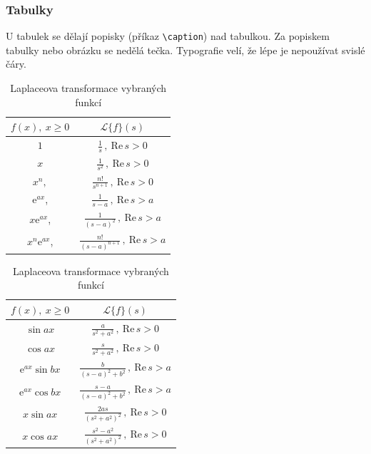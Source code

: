 \documentclass[a4paper,12pt,twoside]{article}
\theoremstyle{definition}
\theoremstyle{remark}
\numberwithin{equation}{section}
\numberwithin{table}{section}
\numberwithin{figure}{section}
\newcommand{\e}{\mathrm{e}}
\newcommand{\lapl}[1]{\mathcal{L}\{#1\}(s)}
\begin{document}
\subsubsection*{Tabulky}
U tabulek se dělají popisky (příkaz \verb!\caption!) nad tabulkou. Za popiskem tabulky nebo obrázku se nedělá tečka. Typografie velí, že lépe je nepoužívat svislé čáry.
\begin{table}[h!]
	\centering
	\caption{Laplaceova transformace vybraných funkcí}\label{tab1}
	\begin{tabular}{cc}
		\toprule
		$f(x),\ x\geq 0$ & $\lapl{f}$\\\midrule
		$1$ & $\displaystyle\frac{1}{s}\,,\ \mathrm{Re}\, s>0$ \\[3mm]
		$x$ & $\displaystyle\frac{1}{s^2}\,,\ \mathrm{Re}\, s>0$ \\[3mm]
		$x^n,$ & $\displaystyle\frac{n!}{s^{n+1}}\,,\ \mathrm{Re}\, s>0$\\[3mm]
		$\e^{ax}$, & $\displaystyle\frac{1}{s-a}\,,\ \mathrm{Re}\,s>a$ \\[3mm]
		$x\e^{ax}$, & $\displaystyle\frac{1}{(s-a)^2}\,,\ \mathrm{Re}\, s>a$ \\[3mm]
		$x^n\e^{ax}$, & $\displaystyle\frac{n!}{(s-a)^{n+1}}\,,\ \mathrm{Re}\, s>a$\\[2mm]
		\bottomrule
	\end{tabular}
	\hspace{1cm}
	\begin{tabular}{cc}
		\toprule
		$f(x),\ x\geq 0$ & $\lapl{f}$\\\midrule
		$\sin ax$ & $\displaystyle\frac{a}{s^2+a^2}\,,\ \mathrm{Re}\, s>0$\\[3mm]
		$\cos ax$ & $\displaystyle\frac{s}{s^2+a^2}\,,\ \mathrm{Re}\, s>0$\\[3.5mm]
		$\e^{ax}\sin bx$ & $\displaystyle\frac{b}{(s-a)^2+b^2}\,,\ \mathrm{Re}\, s>a$\\[3.5mm]
		$\e^{ax}\cos bx$ & $\displaystyle\frac{s-a}{(s-a)^2+b^2}\,,\ \mathrm{Re}\, s>a$\\[3.5mm]
		$x\sin ax$ & $\displaystyle\frac{2as}{(s^2+a^2)^2}\,,\ \mathrm{Re}\, s>0$\\[3mm]
		$x\cos ax$ & $\displaystyle\frac{s^2-a^2}{(s^2+a^2)^2}\,,\ \mathrm{Re}\,s>0$\\[2mm]%
		\bottomrule
	\end{tabular}
\end{table}
\end{document}
